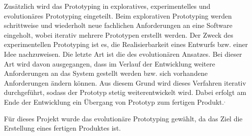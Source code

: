 Zusätzlich wird das Prototyping in exploratives, experimentelles und evolutionäres Prototyping eingeteilt.
Beim explorativen Prototyping werden schrittweise und wiederholt neue fachlichen Anforderungen an eine Software eingeholt, wobei iterativ mehrere Prototypen erstellt werden.
Der Zweck des experimentellen Prototyping ist es, die Realisierbarkeit eines Entwurfs bzw. einer Idee nachzuweisen.
Die letzte Art ist die des evolutionären Ansatzes.
Bei dieser Art wird davon ausgegangen, dass im Verlauf der Entwicklung weitere Anforderungen an das System gestellt werden bzw. sich vorhandene Anforderungen ändern können.
Aus diesem Grund wird dieses Verfahren iterativ durchgeführt, sodass der Prototyp stetig weiterentwickelt wird.
Dabei erfolgt am Ende der Entwicklung ein Übergang von Prototyp zum fertigen Produkt.\autocite[Vgl.][S. 370]{MS-Alpar.2019}$^,$\autocite[Vgl.][S. 6-12]{MS-Floyd.1984}

Für dieses Projekt wurde das evolutionäre Prototyping gewählt, da das Ziel die Erstellung eines fertigen Produktes ist.
